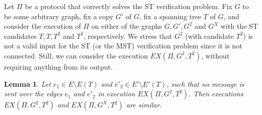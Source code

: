 \documentclass[11pt,letter]{article}
\newtheorem{lemma}[theorem]{Lemma}
\begin{document}
Let $\Pi$ be a protocol that correctly solves the ST verification problem.
Fix $G$ to be some arbitrary graph, fix a copy $G'$ of $G$, 
fix a spanning tree $T$ of $G$, 
and consider  the execution of $\Pi$ on either of the graphs $G,G', G^2$ and $G^X$ 
with the ST candidates $T,T,T^2$ and $T^2$, respectively. 
We stress  that $G^2$ (with candidate $T^2$) is not a valid input for the ST 
(or the MST) verification problem since it is not connected. 
Still, we can consider the execution $EX(\Pi, G^2,T^2)$, 
without requiring anything from its output.

\begin{lemma} 
\label{lem_similarity} 
Let $e_1\in E\setminus E(T)$ and $e'_2\in E'\setminus E'(T)$, such that no 
message is sent over the edges $e_1$ and $e'_2$ in execution $EX(\Pi,G^2,T^2)$. 
Then executions $EX(\Pi, G^2,T^2)$ and $EX(\Pi, G^X,T^2)$ 
are similar.
\end{lemma}
\end{document}
